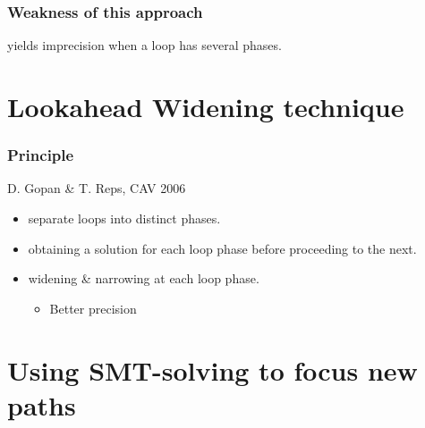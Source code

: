 \documentclass{beamer}
\begin{document}
\begin{frame}
\begin{columns}
\begin{column}{5cm}
\end{column}
\end{columns}
\end{frame}

\begin{frame}
  \frametitle{Weakness of this approach}
	\begin{center}
		yields imprecision when a loop has several phases.
	\end{center}
\end{frame}


\section[Lookahead Widening]{Lookahead Widening technique}

\begin{frame}
  \frametitle{Principle}

D. Gopan \& T. Reps, CAV 2006
\bigskip
\begin{itemize}
\item separate loops into distinct phases.
\item obtaining a solution for each loop phase before proceeding to the next.
\item widening \& narrowing at each loop phase.
\begin{itemize}
\item Better precision
\end{itemize}
\end{itemize}
\end{frame}

\section[Path focusing]{Using SMT-solving to focus new paths}
\end{document}
